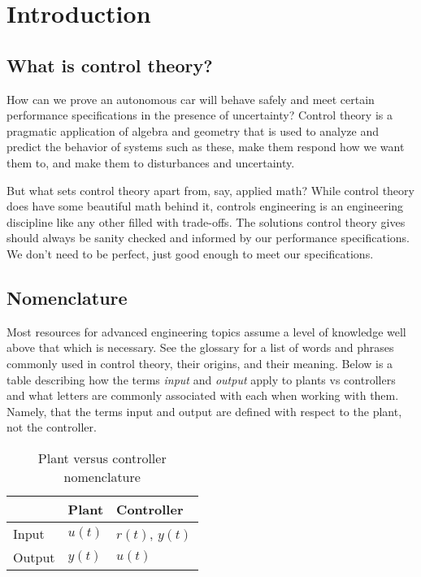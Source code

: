 \chapter{Introduction}

\section{What is control theory?}

How can we prove an autonomous car will behave safely and meet certain
performance specifications in the presence of uncertainty? Control theory is a
pragmatic application of algebra and geometry that is used to analyze and
predict the behavior of \glspl{system} such as these, make them respond how we
want them to, and make them  to \glspl{disturbance}
and uncertainty.

But what sets control theory apart from, say, applied math? While control theory
does have some beautiful math behind it, controls engineering is an engineering
discipline like any other filled with trade-offs. The solutions control theory
gives should always be sanity checked and informed by our performance
specifications. We don't need to be perfect, just good enough to meet our
specifications.

\section{Nomenclature}

Most resources for advanced engineering topics assume a level of knowledge well
above that which is necessary. See the glossary for a list of words and phrases
commonly used in control theory, their origins, and their meaning. Below is a
table describing how the terms \textit{input} and \textit{output} apply to
\glspl{plant} vs \glspl{controller} and what letters are commonly associated
with each when working with them. Namely, that the terms input and output are
defined with respect to the \gls{plant}, not the \gls{controller}.

\begin{table}
  \renewcommand{\arraystretch}{1.3}
  \centering
  \begin{tabular}{|l|ll|}
    \hline
    \rowcolor{headingbg}
    & \textbf{Plant} & \textbf{Controller} \\
    \hline
    Input & $u(t)$ & $r(t)$, $y(t)$ \\
    Output & $y(t)$ & $u(t)$ \\
    \hline
  \end{tabular}
  \caption{Plant versus controller nomenclature}
  \label{tab:plant_v_controller}
\end{table}
